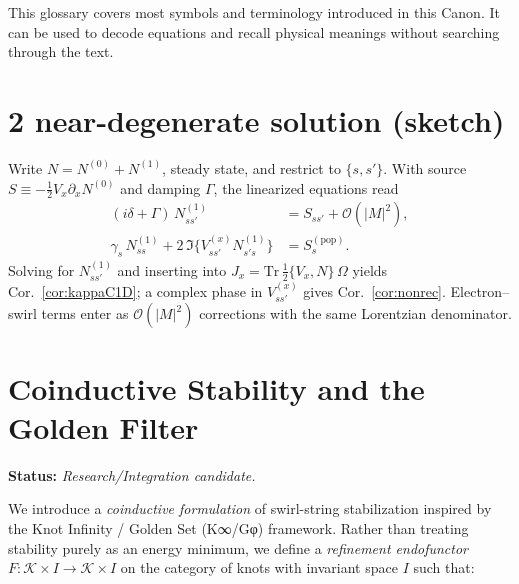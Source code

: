 \documentclass[10pt,reprint,aps,onecolumn,nofootinbib]{revtex4-2}
\begin{document}
	This glossary covers most symbols and terminology introduced in this Canon. It can be used to decode equations and recall physical meanings without searching through the text.








\section*{ 2 near-degenerate solution (sketch)}
Write $N=N^{(0)}+N^{(1)}$, steady state, and restrict to $\{s,s'\}$. With source $S\equiv -\tfrac12 V_x\partial_x N^{(0)}$ and damping $\Gamma$, the linearized equations read
\begin{align}
(i\delta+\Gamma)\,N^{(1)}_{ss'} &= S_{ss'} + \mathcal O(|M|^2),\\
\gamma_s\,N^{(1)}_{ss} + 2\,\Im\{V^{(x)}_{ss'}N^{(1)}_{s's}\} &= S^{(\mathrm{pop})}_s.
\end{align}
Solving for $N^{(1)}_{ss'}$ and inserting into $J_x=\mathrm{Tr}\,\tfrac12\{V_x,N\}\,\Omega$ yields Cor.~\ref{cor:kappaC1D}; a complex phase in $V^{(x)}_{ss'}$ gives Cor.~\ref{cor:nonrec}. Electron–swirl terms enter as $\mathcal O(|M|^2)$ corrections with the same Lorentzian denominator.



    \section{Coinductive Stability and the Golden Filter}
    \label{sec:coinductive-golden}

    \noindent
    \textbf{Status:} \emph{Research/Integration candidate.}

    \medskip

    \noindent
    We introduce a \emph{coinductive formulation} of swirl-string stabilization inspired by the
    Knot Infinity / Golden Set (K∞/Gφ) framework.
    Rather than treating stability purely as an energy minimum, we define a
    \emph{refinement endofunctor}
    \(
    F: \mathcal{K}\times I \to \mathcal{K}\times I
    \)
    on the category of knots with invariant space \(I\)
    such that:
\end{document}
